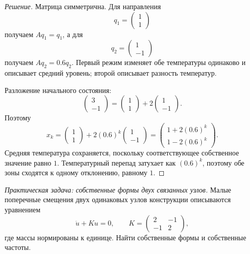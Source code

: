 \begin{proof}[Решение]
Матрица симметрична. Для направления
\[
q_1=
\begin{pmatrix}1\\1\end{pmatrix}
\]
получаем $Aq_1=q_1$, а для
\[
q_2=
\begin{pmatrix}1\\-1\end{pmatrix}
\]
получаем $Aq_2=0.6q_2$. Первый режим изменяет обе температуры одинаково и описывает средний уровень; второй описывает разность температур.

Разложение начального состояния:
\[
\begin{pmatrix}3\\-1\end{pmatrix}
=
\begin{pmatrix}1\\1\end{pmatrix}
+2
\begin{pmatrix}1\\-1\end{pmatrix}.
\]
Поэтому
\[
x_k=
\begin{pmatrix}1\\1\end{pmatrix}
+2(0.6)^k
\begin{pmatrix}1\\-1\end{pmatrix}
=
\begin{pmatrix}
1+2(0.6)^k\\
1-2(0.6)^k
\end{pmatrix}.
\]
Средняя температура сохраняется, поскольку соответствующее собственное значение равно $1$. Температурный перепад затухает как $(0.6)^k$, поэтому обе зоны сходятся к одному отклонению, равному $1$.
\end{proof}

\begin{problem}
\textit{Практическая задача: собственные формы двух связанных узлов.}
Малые поперечные смещения двух одинаковых узлов конструкции описываются уравнением
\[
\ddot u+Ku=0,
\qquad
K=
\begin{pmatrix}
2&-1\\
-1&2
\end{pmatrix},
\]
где массы нормированы к единице. Найти собственные формы и собственные частоты.
\end{problem}

